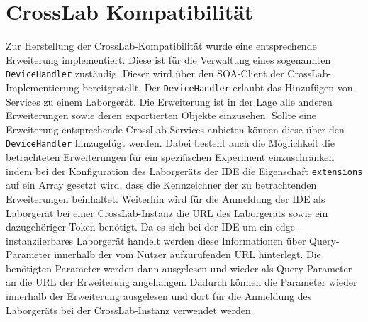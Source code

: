 \section{CrossLab Kompatibilität}\label{section:prototypische-implementierung:crosslab-kompatibilität}

Zur Herstellung der CrossLab-Kompatibilität wurde eine entsprechende Erweiterung implementiert. Diese ist für die Verwaltung eines sogenannten \texttt{DeviceHandler} zuständig. Dieser wird über den SOA-Client der CrossLab-Implementierung bereitgestellt. Der \texttt{DeviceHandler} erlaubt das Hinzufügen von Services zu einem Laborgerät. Die Erweiterung ist in der Lage alle anderen Erweiterungen sowie deren exportierten Objekte einzusehen. Sollte eine Erweiterung entsprechende CrossLab-Services anbieten können diese über den \texttt{DeviceHandler} hinzugefügt werden. Dabei besteht auch die Möglichkeit die betrachteten Erweiterungen für ein spezifischen Experiment einzuschränken indem bei der Konfiguration des Laborgeräts der IDE die Eigenschaft \texttt{extensions} auf ein Array gesetzt wird, dass die Kennzeichner der zu betrachtenden Erweiterungen beinhaltet. Weiterhin wird für die Anmeldung der IDE als Laborgerät bei einer CrossLab-Instanz die URL des Laborgeräts sowie ein dazugehöriger Token benötigt. Da es sich bei der IDE um ein edge-instanziierbares Laborgerät handelt werden diese Informationen über Query-Parameter innerhalb der vom Nutzer aufzurufenden URL hinterlegt. Die benötigten Parameter werden dann ausgelesen und wieder als Query-Parameter an die URL der Erweiterung angehangen. Dadurch können die Parameter wieder innerhalb der Erweiterung ausgelesen und dort für die Anmeldung des Laborgeräts bei der CrossLab-Instanz verwendet werden.